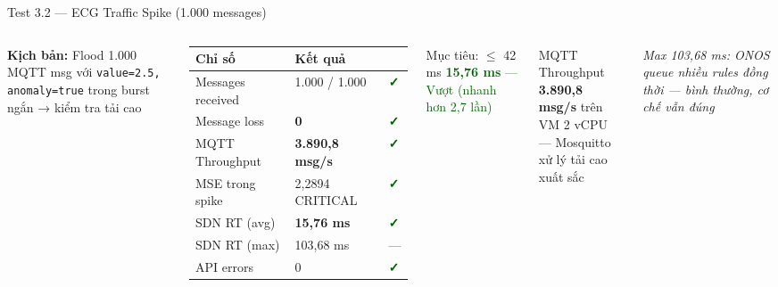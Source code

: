 \documentclass[aspectratio=169, 12pt]{beamer}
\newcommand{\cmark}{\textcolor{darkgreen}{\textbf{✓}}}
\begin{document}
\begin{frame}{Test 3.2 — ECG Traffic Spike (1.000 messages)}

\begin{columns}[T]
\textbf{Kịch bản:} Flood 1.000 MQTT msg với \texttt{value=2.5, anomaly=true} trong burst ngắn → kiểm tra tải cao

\vspace{0.3cm}
\begin{table}
\renewcommand{\arraystretch}{1.3}
\begin{tabular}{lll}
\toprule
\textbf{Chỉ số} & \textbf{Kết quả} & \\
\midrule
Messages received & 1.000 / 1.000 & \cmark \\
Message loss & \textbf{0} & \cmark \\
MQTT Throughput & \textbf{3.890,8 msg/s} & \cmark \\
MSE trong spike & 2,2894 CRITICAL & \cmark \\
SDN RT (avg) & \textbf{15,76 ms} & \cmark \\
SDN RT (max) & 103,68 ms & — \\
API errors & 0 & \cmark \\
\bottomrule
\end{tabular}
\end{table}

\begin{exampleblock}{Mục tiêu: $\leq$ 42 ms}
\textcolor{darkgreen}{\textbf{15,76 ms} — Vượt (nhanh hơn 2,7 lần)}
\end{exampleblock}

\begin{exampleblock}{MQTT Throughput}
\textbf{3.890,8 msg/s} trên VM 2 vCPU\\
— Mosquitto xử lý tải cao xuất sắc
\end{exampleblock}

\vspace{0.2cm}
\textit{Max 103,68 ms: ONOS queue nhiều rules đồng thời — bình thường, cơ chế vẫn đúng}
\end{columns}

\end{frame}
\end{document}
